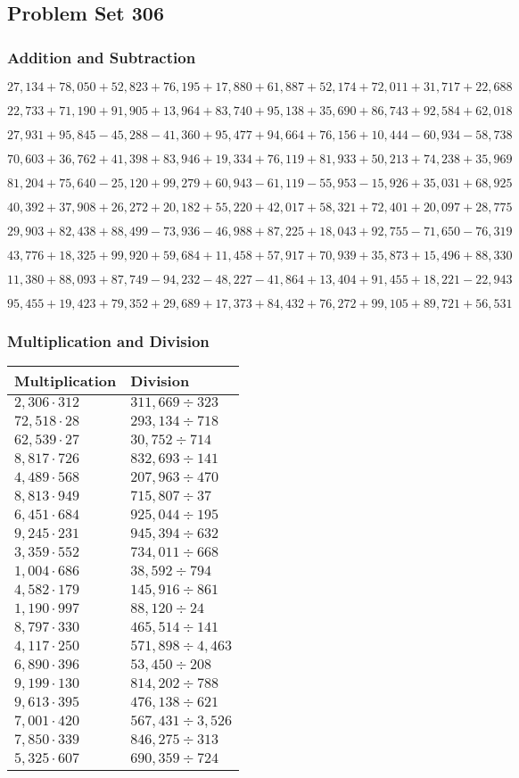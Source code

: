 \hypertarget{problem-set-306}{%
\subsection{Problem Set 306}\label{problem-set-306}}

\hypertarget{addition-and-subtraction}{%
\subsubsection{Addition and
Subtraction}\label{addition-and-subtraction}}

\(27,134+78,050+52,823+76,195+17,880+61,887+52,174+72,011+31,717+22,688\)

\(22,733+71,190+91,905+13,964+83,740+95,138+35,690+86,743+92,584+62,018\)

\(27,931+95,845-45,288-41,360+95,477+94,664+76,156+10,444-60,934-58,738\)

\(70,603+36,762+41,398+83,946+19,334+76,119+81,933+50,213+74,238+35,969\)

\(81,204+75,640-25,120+99,279+60,943-61,119-55,953-15,926+35,031+68,925\)

\(40,392+37,908+26,272+20,182+55,220+42,017+58,321+72,401+20,097+28,775\)

\(29,903+82,438+88,499-73,936-46,988+87,225+18,043+92,755-71,650-76,319\)

\(43,776+18,325+99,920+59,684+11,458+57,917+70,939+35,873+15,496+88,330\)

\(11,380+88,093+87,749-94,232-48,227-41,864+13,404+91,455+18,221-22,943\)

\(95,455+19,423+79,352+29,689+17,373+84,432+76,272+99,105+89,721+56,531\)

\hypertarget{multiplication-and-division}{%
\subsubsection{Multiplication and
Division}\label{multiplication-and-division}}

\begin{longtable}[]{@{}ll@{}}
\toprule
Multiplication & Division\tabularnewline
\midrule
\endhead
\(2,306\cdot312\) & \(311,669÷323\)\tabularnewline
\(72,518\cdot28\) & \(293,134÷718\)\tabularnewline
\(62,539\cdot27\) & \(30,752÷714\)\tabularnewline
\(8,817\cdot726\) & \(832,693÷141\)\tabularnewline
\(4,489\cdot568\) & \(207,963÷470\)\tabularnewline
\(8,813\cdot949\) & \(715,807÷37\)\tabularnewline
\(6,451\cdot684\) & \(925,044÷195\)\tabularnewline
\(9,245\cdot231\) & \(945,394÷632\)\tabularnewline
\(3,359\cdot552\) & \(734,011÷668\)\tabularnewline
\(1,004\cdot686\) & \(38,592÷794\)\tabularnewline
\(4,582\cdot179\) & \(145,916÷861\)\tabularnewline
\(1,190\cdot997\) & \(88,120÷24\)\tabularnewline
\(8,797\cdot330\) & \(465,514÷141\)\tabularnewline
\(4,117\cdot250\) & \(571,898÷4,463\)\tabularnewline
\(6,890\cdot396\) & \(53,450÷208\)\tabularnewline
\(9,199\cdot130\) & \(814,202÷788\)\tabularnewline
\(9,613\cdot395\) & \(476,138÷621\)\tabularnewline
\(7,001\cdot420\) & \(567,431÷3,526\)\tabularnewline
\(7,850\cdot339\) & \(846,275÷313\)\tabularnewline
\(5,325\cdot607\) & \(690,359÷724\)\tabularnewline
\bottomrule
\end{longtable}

